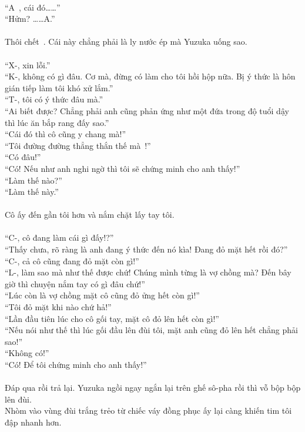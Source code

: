 \documentclass[12pt,a4paper, twosides]{book}
\begin{document}
\\
“A~, cái đó……”\\
“Hửm? ……A.”\\
\\
Thôi chết~. Cái này chẳng phải là ly nước ép mà Yuzuka uống sao.\\
\\
“X-, xin lỗi.”\\
“K-, không có gì đâu. Cơ mà, đừng có làm cho tôi hồi hộp nữa. Bị ý thức là hôn gián tiếp làm tôi khó xử lắm.”\\
“T-, tôi có ý thức đâu mà.”\\
“Ai biết được? Chẳng phải anh cũng phản ứng như một đứa trong độ tuổi dậy thì lúc ăn bắp rang đấy sao.”\\
“Cái đó thì cô cũng y chang mà!”\\
“Tôi đường đường thẳng thắn thế mà~!”\\
“Có đâu!”\\
“Có! Nếu như anh nghi ngờ thì tôi sẽ chứng minh cho anh thấy!”\\
“Làm thế nào?”\\
“Làm thế này.”\\
\\
Cô ấy đến gần tôi hơn và nắm chặt lấy tay tôi.\\
\\
“C-, cô đang làm cái gì đấy!?”\\
“Thấy chưa, rõ ràng là anh đang ý thức đến nó kìa! Đang đỏ mặt hết rồi đó?”\\
“C-, cả cô cũng đang đỏ mặt còn gì!”\\
“L-, làm sao mà như thế được chứ! Chúng mình từng là vợ chồng mà? Đến bây giờ thì chuyện nắm tay có gì đâu chứ!”\\
“Lúc còn là vợ chồng mặt cô cũng đỏ ửng hết còn gì!”\\
“Tôi đỏ mặt khi nào chứ hả!”\\
“Lần đầu tiên lúc cho cô gối tay, mặt cô đỏ lên hết còn gì!”\\
“Nếu nói như thế thì lúc gối đầu lên đùi tôi, mặt anh cũng đỏ lên hết chẳng phải sao!”\\
“Không có!”\\
“Có! Để tôi chứng minh cho anh thấy!”\\
\\
Đáp qua rồi trả lại. Yuzuka ngồi ngay ngắn lại trên ghế sô-pha rồi thì vỗ bộp bộp lên đùi.\\
Nhòm vào vùng đùi trắng trẻo từ chiếc váy đồng phục ấy lại càng khiến tim tôi đập nhanh hơn.\\
\end{document}
